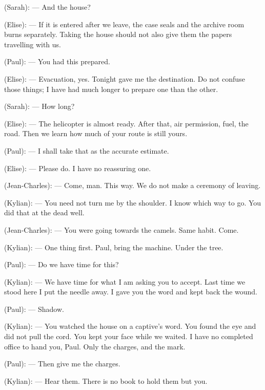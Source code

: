 \begin{room}
(Sarah): --- And the house?

(Elise): --- If it is entered after we leave, the case seals and the archive room burns separately. Taking the house should not also give them the papers travelling with us.

(Paul): --- You had this prepared.

(Elise): --- Evacuation, yes. Tonight gave me the destination. Do not confuse those things; I have had much longer to prepare one than the other.

(Sarah): --- How long?

(Elise): --- The helicopter is almost ready. After that, air permission, fuel, the road. Then we learn how much of your route is still yours.

(Paul): --- I shall take that as the accurate estimate.

(Elise): --- Please do. I have no reassuring one.

(Jean-Charles): --- Come, man. This way. We do not make a ceremony of leaving.

(Kylian): --- You need not turn me by the shoulder. I know which way to go. You did that at the dead well.

(Jean-Charles): --- You were going towards the camels. Same habit. Come.

(Kylian): --- One thing first. Paul, bring the machine. Under the tree.

\centerline{}

(Paul): --- Do we have time for this?

(Kylian): --- We have time for what I am asking you to accept. Last time we stood here I put the needle away. I gave you the word and kept back the wound.

(Paul): --- Shadow.

(Kylian): --- You watched the house on a captive's word. You found the eye and did not pull the cord. You kept your face while we waited. I have no completed office to hand you, Paul. Only the charges, and the mark.

(Paul): --- Then give me the charges.

(Kylian): --- Hear them. There is no book to hold them but you.


\end{room}
